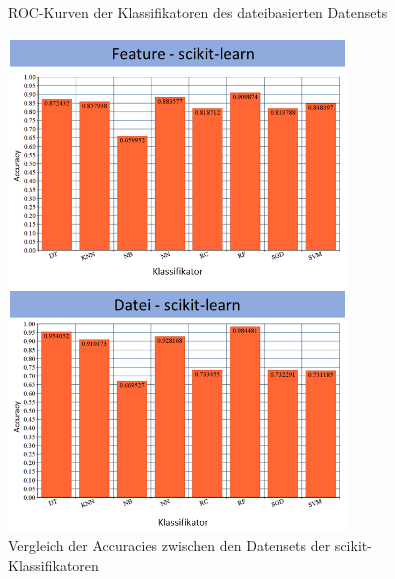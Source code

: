 \begin{figure}
  \caption{ROC-Kurven der Klassifikatoren des dateibasierten Datensets}
\end{figure}

\begin{figure}[]
    \centering
    \includegraphics[width=0.8\textwidth]{images/Final_scikit}
    \caption{Vergleich der Accuracies zwischen den Datensets der scikit-Klassifikatoren\label{fig:final-scikit}}
\end{figure}

